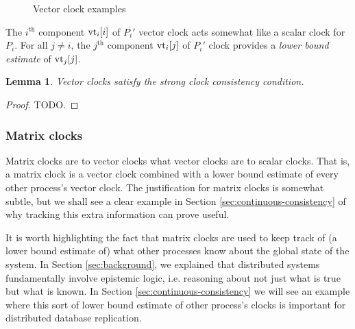 \documentclass[]             %
{NASA}                       %
\newtheorem{lemma}[theorem]{Lemma}
\theoremstyle{definition}
\begin{document}
\begin{figure}[p]
  \setlength\belowcaptionskip{5ex}

  \begin{subfigure}{1\textwidth}
    \centering
    
    \label{fig:message-latencies-vector-a}
  \end{subfigure}

  \vspace{4ex}

  \begin{subfigure}{1\textwidth}
    \centering 
    \label{fig:message-latencies-vector-b}
  \end{subfigure}

  \begin{subfigure}{1\textwidth}
    \label{fig:message-latencies-vector-c}
  \end{subfigure}

  \caption{Vector clock examples}
  \label{fig:message-latencies-vector}
\end{figure}

\afterpage{\clearpage}

The $i^\textrm{th}$ component $\textrm{vt}_i[i]$ of $P_i'$ vector clock acts
somewhat like a scalar clock for $P_i$. For all $j \neq i$, the
$j^\textrm{th}$ component $\textrm{vt}_i[j]$ of $P_i'$ clock provides a
\emph{lower bound estimate} of $\textrm{vt}_j[j]$.

\begin{lemma}
  Vector clocks satisfy the strong clock consistency condition.
\end{lemma}
\begin{proof}
  TODO.
\end{proof}

\subsubsection{Matrix clocks}

Matrix clocks are to vector clocks what vector clocks are to scalar
clocks. That is, a matrix clock is a vector clock combined with a
lower bound estimate of every other process's vector clock. The
justification for matrix clocks is somewhat subtle, but we shall see a
clear example in Section \ref{sec:continuous-consistency} of why
tracking this extra information can prove useful.

It is worth highlighting the fact that matrix clocks are used to keep
track of (a lower bound estimate of) what other processes know about
the global state of the system. In Section \ref{sec:background}, we
explained that distributed systems fundamentally involve epistemic
logic, i.e. reasoning about not just what is true but what is
known. In Section \ref{sec:continuous-consistency} we will see an
example where this sort of lower bound estimate of other process's
clocks is important for distributed database replication.
\end{document}
